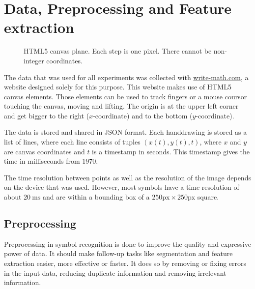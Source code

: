 \chapter{Data, Preprocessing and Feature extraction}\label{ch:preprocessing}

\begin{figure}
  \vspace{-35pt}
  \begin{center}
    
  \end{center}
  \vspace{-20pt}
  \caption{HTML5 canvas plane. Each step is one pixel. There cannot be non-integer
           coordinates.}
  \label{fig:canvas-plane}
  \vspace{-10pt}
\end{figure}

The data that was used for all experiments was collected with
\href{http://write-math.com}{write-math.com}, a website designed solely for
this purpose. This website makes use of HTML5 canvas elements. Those elements
can be used to track fingers or a mouse coursor touching the canvas, moving
and lifting. The origin is at the upper left corner and get bigger to the right
($x$-coordinate) and to the bottom ($y$-coordinate).

The data is stored and shared in JSON format. Each handdrawing is stored as a
list of lines, where each line consists of tuples $(x(t), y(t), t)$, where $x$
and $y$ are canvas coordinates and $t$ is a timestamp in seconds. This timestamp
gives the time in milliseconds from 1970.

The time resolution between points as well as the resolution of the image
depends on the device that was used. However, most symbols have a time
resolution of about $\SI{20}{\milli\second}$ and are within a bounding box of a
$250 \text{px} \times 250 \text{px}$ square.

\section{Preprocessing}\label{sec:preprocessing}
Preprocessing in symbol recognition is done to improve the quality and
expressive power of data. It should make follow-up tasks like segmentation and
feature extraction easier, more effective or faster. It does so by removing
or fixing errors in the input data, reducing duplicate information and
removing irrelevant information.

